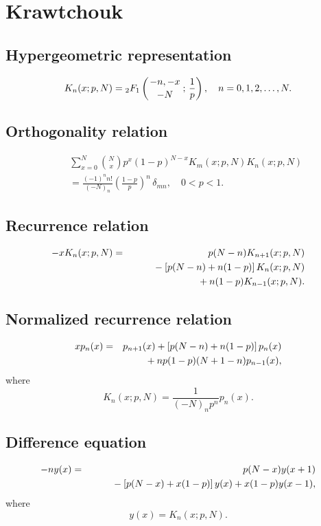 \documentclass[envcountchap,graybox]{svmono}
\newcommand{\hyp}[5]{\mbox{}_{#1}{F}_{#2}
\left(\genfrac{}{}{0pt}{}{#3}{#4}\,;\,#5\right)}
\newcommand{\mathindent}{\hspace{7.5mm}}
\begin{document}
\section{Krawtchouk}

\par\setcounter{equation}{0}

\subsection*{Hypergeometric representation}
\begin{equation}
\label{DefKrawtchouk}
K_n(x;p,N)=\hyp{2}{1}{-n,-x}{-N}{\frac{1}{p}},\quad n=0,1,2,\ldots,N.
\end{equation}

\subsection*{Orthogonality relation}
\begin{eqnarray}
\label{OrtKrawtchouk}
& &\sum_{x=0}^N\binom{N}{x}p^x(1-p)^{N-x} K_m(x;p,N)K_n(x;p,N)\nonumber\\
& &{}=\frac{(-1)^nn!}{(-N)_n}\left(\frac{1-p}{p}\right)^n\,\delta_{mn},\quad0 < p < 1.
\end{eqnarray}

\subsection*{Recurrence relation}
\begin{eqnarray}
\label{RecKrawtchouk}
-xK_n(x;p,N)&=&p(N-n)K_{n+1}(x;p,N)\nonumber\\
& &{}\mathindent{}-\left[p(N-n)+n(1-p)\right]K_n(x;p,N)\nonumber\\
& &{}\mathindent\mathindent{}+n(1-p)K_{n-1}(x;p,N).
\end{eqnarray}

\subsection*{Normalized recurrence relation}
\begin{eqnarray}
\label{NormRecKrawtchouk}
xp_n(x)&=&p_{n+1}(x)+\left[p(N-n)+n(1-p)\right]p_n(x)\nonumber\\
& &{}\mathindent{}+np(1-p)(N+1-n)p_{n-1}(x),
\end{eqnarray}
where
$$K_n(x;p,N)=\frac{1}{(-N)_np^n}p_n(x).$$

\subsection*{Difference equation}
\begin{eqnarray}
\label{dvKrawtchouk}
-ny(x)&=&p(N-x)y(x+1)\nonumber\\
& &{}\mathindent{}-\left[p(N-x)+x(1-p)\right]y(x)+x(1-p)y(x-1),
\end{eqnarray}
where
$$y(x)=K_n(x;p,N).$$
\end{document}
